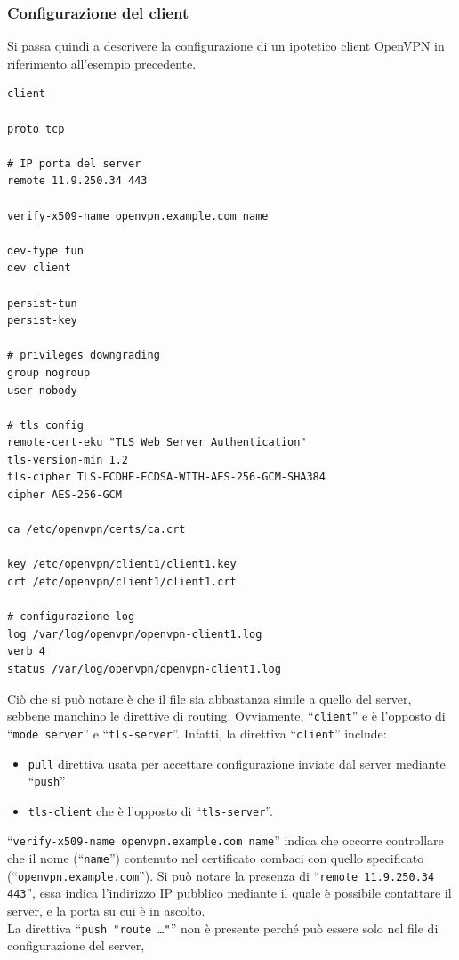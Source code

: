 \subsubsection{Configurazione del client}
Si passa quindi a descrivere la configurazione di un ipotetico client OpenVPN in
riferimento all'esempio precedente.
\begin{verbatim}
client
	
proto tcp
	
# IP porta del server
remote 11.9.250.34 443

verify-x509-name openvpn.example.com name
	
dev-type tun
dev client
	
persist-tun
persist-key
	
# privileges downgrading
group nogroup
user nobody
	
# tls config
remote-cert-eku "TLS Web Server Authentication"
tls-version-min 1.2
tls-cipher TLS-ECDHE-ECDSA-WITH-AES-256-GCM-SHA384
cipher AES-256-GCM
	
ca /etc/openvpn/certs/ca.crt
	
key /etc/openvpn/client1/client1.key
crt /etc/openvpn/client1/client1.crt
	
# configurazione log
log /var/log/openvpn/openvpn-client1.log
verb 4
status /var/log/openvpn/openvpn-client1.log
\end{verbatim}
Ciò che si può notare è che il file sia abbastanza simile a quello del server,
sebbene manchino le direttive di routing. Ovviamente, ``\texttt{client}'' e
è l'opposto di ``\texttt{mode server}'' e
``\texttt{tls-server}''. Infatti, la direttiva ``\texttt{client}'' include:
\begin{itemize}
	\item \texttt{pull} direttiva usata per accettare configurazione inviate dal
	      server mediante ``\texttt{push}''
	\item \texttt{tls-client} che è l'opposto di ``\texttt{tls-server}''.
\end{itemize}
``\texttt{verify-x509-name openvpn.example.com name}'' indica che occorre controllare che
il nome (``\texttt{name}'') contenuto nel certificato combaci con quello specificato
(``\texttt{openvpn.example.com}''). Si può notare la presenza di ``\texttt{remote 11.9.250.34 443}'',
essa indica l'indirizzo IP pubblico mediante il quale è possibile contattare
il server, e la porta su cui è in ascolto.\\
La direttiva ``\texttt{push "route \ldots"}''
non è presente perché può essere solo nel file di configurazione del server,
